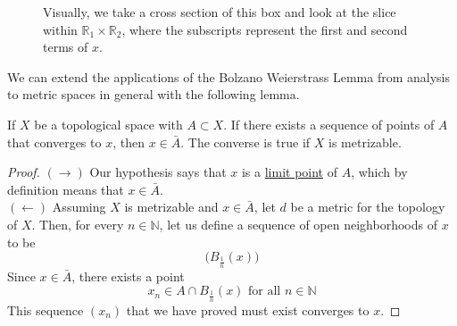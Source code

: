   \begin{figure}[H]
    \centering 
    \caption{Visually, we take a cross section of this box and look at the slice within $\mathbb{R}_1 \times \mathbb{R}_2$, where the subscripts represent the first and second terms of $x$.}
    \label{fig:cross_sec}
  \end{figure}

  We can extend the applications of the Bolzano Weierstrass Lemma from analysis to metric spaces in general with the following lemma. 

  \begin{lemma}
    \label{thm:sequence-lemma}
    If $X$ be a topological space with $A \subset X$. If there exists a sequence of points of $A$ that converges to $x$, then $x \in \bar{A}$. The converse is true if $X$ is metrizable. 
  \end{lemma}
  \begin{proof}
    $(\rightarrow)$ Our hypothesis says that $x$ is a \hyperref[def:limit-point]{limit point} of $A$, which by definition means that $x \in \bar{A}$. \\
    $(\leftarrow)$ Assuming $X$ is metrizable and $x \in \bar{A}$, let $d$ be a metric for the topology of $X$. Then, for every $n \in \mathbb{N}$, let us define a sequence of open neighborhoods of $x$ to be
    \begin{equation}
      \big(B_{\frac{1}{n}} (x) \big)
    \end{equation}
    Since $x \in \bar{A}$, there exists a point 
    \begin{equation}
      x_n \in A \cap B_{\frac{1}{n}} (x) \text{ for all } n \in \mathbb{N}
    \end{equation}
    This sequence $(x_n)$ that we have proved must exist converges to $x$. 
  \end{proof}

